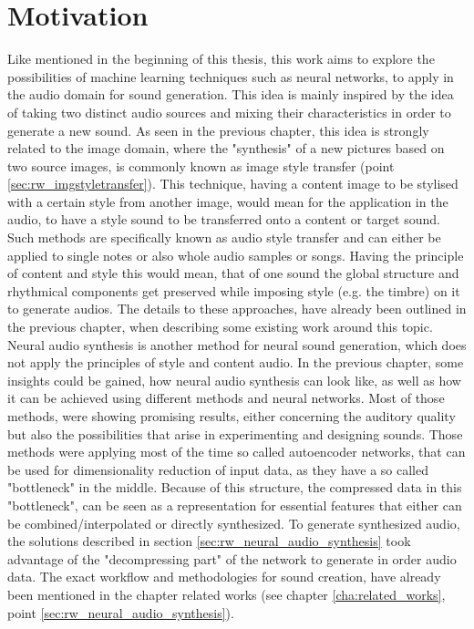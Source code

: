 \section{Motivation}
\label{sec:app_motivation}
Like mentioned in the beginning of this thesis, this work aims to explore the possibilities of machine learning techniques such as neural networks, to apply in the audio domain for sound generation. This idea is mainly inspired by the idea of taking two distinct audio sources and mixing their characteristics in order to generate a new sound. As seen in the previous chapter, this idea is strongly related to the image domain, where the "synthesis" of a new pictures based on two source images, is commonly known as image style transfer (point \ref{sec:rw_imgstyletransfer}). This technique, having a content image to be stylised with a certain style from another image, would mean for the application in the audio, to have a style sound to be transferred onto a content or target sound. Such methods are specifically known as audio style transfer and can either be applied to single notes or also whole audio samples or songs. Having the principle of content and style this would mean, that of one sound the global structure and rhythmical components get preserved while imposing style (e.g. the timbre) on it to generate audios. The details to these approaches, have already been outlined in the previous chapter, when describing some existing work around this topic.\\

Neural audio synthesis is another method for neural sound generation, which does not apply the principles of style and content audio. In the previous chapter, some insights could be gained, how neural audio synthesis can look like, as well as how it can be achieved using different methods and neural networks. Most of those methods, were showing promising results, either concerning the auditory quality but also the possibilities that arise in experimenting and designing sounds. Those methods were applying most of the time so called autoencoder networks, that can be used for dimensionality reduction of input data, as they have a so called "bottleneck" in the middle. \cite{hinton2006autoencoder} Because of this structure, the compressed data in this "bottleneck", can be seen as a representation for essential features that either can be combined/interpolated or directly synthesized. To generate synthesized audio, the solutions described in section \ref{sec:rw_neural_audio_synthesis} took advantage of the "decompressing part" of the network to generate in order audio data. The exact workflow and methodologies for sound creation, have already been mentioned in the chapter related works (see chapter \ref{cha:related_works}, point \ref{sec:rw_neural_audio_synthesis}).

